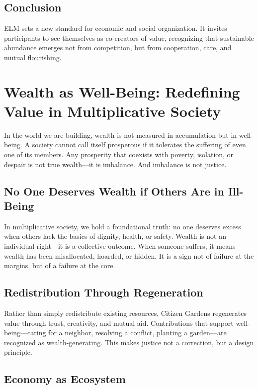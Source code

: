 \documentclass[12pt]{article}
\begin{document}
\subsection{Conclusion}

ELM sets a new standard for economic and social organization. It invites participants to see themselves as co-creators of value, recognizing that sustainable abundance emerges not from competition, but from cooperation, care, and mutual flourishing.

\section{Wealth as Well-Being: Redefining Value in Multiplicative Society}

In the world we are building, wealth is not measured in accumulation but in well-being. A society cannot call itself prosperous if it tolerates the suffering of even one of its members. Any prosperity that coexists with poverty, isolation, or despair is not true wealth—it is imbalance. And imbalance is not justice.

\subsection*{No One Deserves Wealth if Others Are in Ill-Being}

In multiplicative society, we hold a foundational truth: no one deserves excess when others lack the basics of dignity, health, or safety. Wealth is not an individual right—it is a collective outcome. When someone suffers, it means wealth has been misallocated, hoarded, or hidden. It is a sign not of failure at the margins, but of a failure at the core.

\subsection*{Redistribution Through Regeneration}

Rather than simply redistribute existing resources, Citizen Gardens regenerates value through trust, creativity, and mutual aid. Contributions that support well-being—caring for a neighbor, resolving a conflict, planting a garden—are recognized as wealth-generating. This makes justice not a correction, but a design principle.

\subsection*{Economy as Ecosystem}
\end{document}
